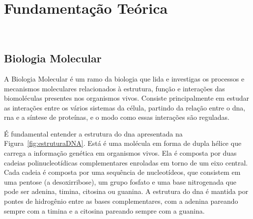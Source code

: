 
\setlength{\parskip}{0.3cm}

\chapter{Fundamentação Teórica}~\label{ch:fundamentacao}

\section{Biologia Molecular}
A Biologia Molecular é um ramo da biologia que lida e investigas os processos e mecanismos moleculares relacionados à estrutura, função e interações das biomoléculas presentes nos organismos vivos. Consiste principalmente em estudar as interações entre os vários sistemas da célula, partindo da relação entre o \gls{dna}, \gls{rna} e a síntese de proteínas, e o modo como essas interações são reguladas.

É fundamental entender a estrutura do \gls{dna} apresentada na Figura~\ref{fig:estruturaDNA}. Está é uma molécula em forma de dupla hélice que carrega a informação genética em organismos vivos. Ela é composta por duas cadeias polinucleotídicas complementares enroladas em torno de um eixo central. Cada cadeia é composta por uma sequência de nucleotídeos, que consistem em uma pentose (a desoxirribose), um grupo fosfato e uma base nitrogenada que pode ser \gls{adenina}, \gls{timina}, \gls{citosina} ou \gls{guanina}. A estrutura do \gls{dna} é mantida por pontes de hidrogênio entre as bases complementares, com a adenina pareando sempre com a timina e a citosina pareando sempre com a guanina.

